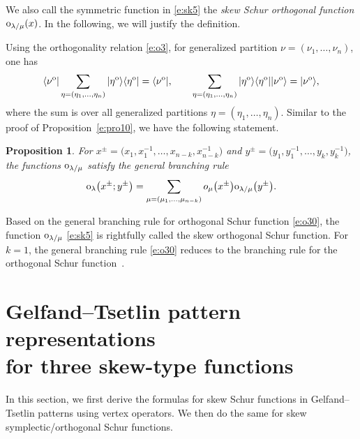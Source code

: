 \documentclass[pdftex]{sigma}
\numberwithin{equation}{section}
\newtheorem{Proposition}[Theorem]{Proposition}
 { \theoremstyle{definition}
\newtheorem{Definition}[Theorem]{Definition}
\newtheorem{Note}[Theorem]{Note}
\newtheorem{Example}[Theorem]{Example}
\newtheorem{Remark}[Theorem]{Remark} }
\begin{document}
We also call the symmetric function in \eqref{e:sk5} the {\it skew Schur orthogonal function} ${\rm o}_{\lambda/\mu}(x)$. In the following, we will justify the definition.

Using the orthogonality relation \eqref{e:o3}, for generalized partition $\nu=(\nu_1,\dots,\nu_n)$, one has
\begin{align}
\label{e:o24}\langle\nu^{\rm o}|\sum_{\eta=(\eta_1,\dots,\eta_n)}|\eta^{\rm o}\rangle\langle\eta^{\rm o}| = \langle\nu^{\rm o}|,\qquad \sum_{\eta=(\eta_1,\dots,\eta_n)}|\eta^{\rm o}\rangle\langle\eta^{\rm o}||\nu^{\rm o}\rangle = |\nu^{\rm o}\rangle,
\end{align}
where the sum is over all generalized partitions $\eta=(\eta_1,\dots,\eta_n)$. Similar to the proof of Proposition~\ref{e:pro10}, we have the following statement.

\begin{Proposition}For $x^{\pm}=\big(x_1,x^{-1}_1,\dots,x_{n-k},x^{-1}_{n-k}\big)$ and $y^{\pm}=\big(y_1,y^{-1}_1,\dots,y_{k},y^{-1}_{k}\big)$, the functions ${\rm o}_{\lambda/\mu}$ satisfy the general branching rule
\begin{align}\label{e:o30}
{\rm o}_\lambda\big(x^{\pm};y^{\pm}\big)=\sum_{\mu=(\mu_1,\dots,\mu_{n-k})}o_\mu\big(x^{\pm}\big){\rm o}_{\lambda/\mu}\big(y^{\pm}\big).
\end{align}
\end{Proposition}
\begin{Remark}
Based on the general branching rule for orthogonal Schur function \eqref{e:o30}, the function ${\rm o}_{\lambda/\mu}$ \eqref{e:sk5} is rightfully called the skew orthogonal Schur function. For $k=1$, the general branching rule \eqref{e:o30} reduces to the branching rule for the orthogonal Schur function~\mbox{\cite[Theorem 3.2]{KT1990}}.
\end{Remark}

\section[Gelfand--Tsetlin pattern representations for three skew-type functions]{Gelfand--Tsetlin pattern representations\\ for three skew-type functions}\label{s4}

In this section, we first derive the formulas for skew Schur functions in Gelfand--Tsetlin patterns using vertex operators. We then do the same for
skew symplectic/orthogonal Schur functions.
\end{document}
